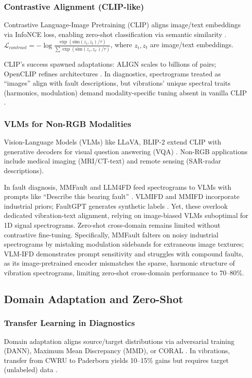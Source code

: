 \subsubsection{Contrastive Alignment (CLIP-like)}
Contrastive Language-Image Pretraining (CLIP) aligns image/text embeddings via InfoNCE loss, enabling zero-shot classification via semantic similarity \cite{radford2021clip}. $\mathcal{L}_{contrast} = -\log \frac{\exp(\mathrm{sim}(z_i, z_t)/\tau)}{\sum \exp(\mathrm{sim}(z_i, z_{t'})/\tau)}$, where $z_i, z_t$ are image/text embeddings.

CLIP's success spawned adaptations: ALIGN scales to billions of pairs; OpenCLIP refines architectures \cite{li2023align,jia2021scaling}. In diagnostics, spectrograms treated as ``images'' align with fault descriptions, but vibrations' unique spectral traits (harmonics, modulation) demand modality-specific tuning absent in vanilla CLIP \cite{kim2025llmzs}.

\subsubsection{VLMs for Non-RGB Modalities}
Vision-Language Models (VLMs) like LLaVA, BLIP-2 extend CLIP with generative decoders for visual question answering (VQA) \cite{liu2023llava}. Non-RGB applications include medical imaging (MRI/CT-text) and remote sensing (SAR-radar descriptions).

In fault diagnosis, MMFault and LLM4FD feed spectrograms to VLMs with prompts like ``Describe this bearing fault'' \cite{zhang2024mmfault,li2024llm4fd}. VLMIFD and MMIFD incorporate industrial priors; FaultGPT generates synthetic labels \cite{zhao2025vlmifd,xu2025mmifd,liu2024faultgpt}. Yet, these overlook dedicated vibration-text alignment, relying on image-biased VLMs suboptimal for 1D signal spectrograms. Zero-shot cross-domain remains limited without contrastive fine-tuning. Specifically, MMFault falters on noisy industrial spectrograms by mistaking modulation sidebands for extraneous image textures; VLM-IFD demonstrates prompt sensitivity and struggles with compound faults, as its image-pretrained encoder mismatches the sparse, harmonic structure of vibration spectrograms, limiting zero-shot cross-domain performance to 70--80\%.

\subsection{Domain Adaptation and Zero-Shot}
\subsubsection{Transfer Learning in Diagnostics}
Domain adaptation aligns source/target distributions via adversarial training (DANN), Maximum Mean Discrepancy (MMD), or CORAL \cite{qiao2022grl,li2021mmd,wen2020domain}. In vibrations, transfer from CWRU to Paderborn yields 10--15\% gains but requires target (unlabeled) data \cite{wang2020transfer}.

